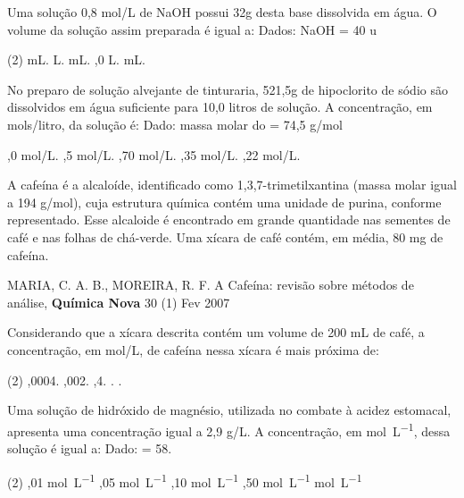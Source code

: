 \documentclass[11pt]{scrartcl}
\begin{document}
\begin{exercise}[points=1.0]
Uma solução 0,8 mol/L de NaOH possui 32g desta base dissolvida em água. O volume da solução assim
preparada é igual a: Dados:  NaOH = 40 u

\begin{choice}(2)
 mL.
 L.
 mL.
,0 L.
 mL.
\end{choice}
\end{exercise}

\begin{exercise}[points=1.0]
No preparo de solução alvejante de tinturaria, 521,5g de hipoclorito de sódio são dissolvidos em água
suficiente para 10,0 litros de solução. A concentração, em mols/litro, da solução é: Dado: massa molar do  = 74,5 g/mol

\begin{choice}
,0 mol/L.
,5 mol/L.
,70 mol/L.
,35 mol/L.
,22 mol/L.
\end{choice}
\end{exercise}

\begin{exercise}[points=1.0]
A cafeína é a alcaloíde, identificado como 1,3,7-trimetilxantina (massa molar igual a 194 g/mol), cuja estrutura química contém uma unidade de purina, conforme representado. Esse alcaloide é encontrado em grande quantidade nas sementes de café e nas folhas de chá-verde. Uma xícara de café contém, em média, 80 mg de cafeína.

\begin{center}

\scriptsize 
MARIA, C. A. B., MOREIRA, R. F. A Cafeína: revisão sobre métodos de análise, \textbf{Química Nova} 30 (1) Fev 2007
\end{center}


Considerando que a xícara descrita contém um volume de 200 mL de café, a concentração, em mol/L, de cafeína nessa xícara é mais próxima de:

\begin{choice}(2)
,0004.
,002.
,4.
.
.
\end{choice}
\end{exercise}


\begin{exercise}[points=1.0]
Uma solução de hidróxido de magnésio, utilizada no combate à acidez estomacal, apresenta uma concentração igual a 2,9 g/L. A concentração, em \unit{\mole\per\liter}, dessa solução é igual a: Dado:  = 58.

\begin{choice}(2)
,01 \unit{\mole\per\liter}
,05 \unit{\mole\per\liter}
,10 \unit{\mole\per\liter}
,50 \unit{\mole\per\liter}
 \unit{\mole\per\liter}
\end{choice}
\end{exercise}








\end{document}
